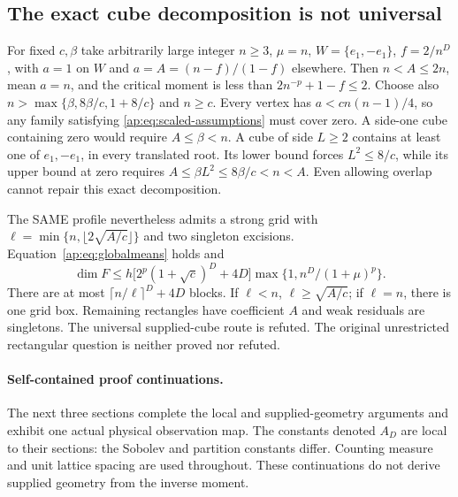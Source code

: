 \documentclass[11pt]{article}
\begin{document}
\subsection{The exact cube decomposition is not universal}
For fixed $c,\beta$ take arbitrarily large integer $n\geq3$, $\mu=n$,
$W=\{e_1,-e_1\}$, $f=2/n^D$, with $a=1$ on $W$ and
$a=A=(n-f)/(1-f)$ elsewhere. Then $n<A\leq2n$, mean $a=n$, and the
critical moment is less than $2n^{-p}+1-f\leq2$. Choose also
$n>\max\{\beta,8\beta/c,1+8/c\}$ and $n\geq c$.
Every vertex has $a<cn(n-1)/4$, so any family satisfying
\eqref{ap:eq:scaled-assumptions} must cover zero. A side-one cube containing
zero would require $A\leq\beta<n$. A cube of side $L\geq2$ contains at
least one of $e_1,-e_1$, in every translated root. Its lower bound forces
$L^2\leq8/c$, while its upper bound at zero requires
$A\leq\beta L^2\leq8\beta/c<n<A$. Even allowing overlap cannot repair
this exact decomposition.

The SAME profile nevertheless admits a strong grid with
$\ell=\min\{n,\lfloor2\sqrt{A/c}\rfloor\}$ and two singleton excisions.
Equation~\eqref{ap:eq:globalmeans} holds and
\[
 \dim F\leq h\bigl[2^p(1+\sqrt c)^D+4D\bigr]
                  \max\{1,n^D/(1+\mu)^p\}.
\]
There are at most $\lceil n/\ell\rceil^D+4D$ blocks. If $\ell<n$,
$\ell\geq\sqrt{A/c}$; if $\ell=n$, there is one grid box. Remaining
rectangles have coefficient $A$ and weak residuals are singletons. The
universal supplied-cube route is refuted. The original unrestricted
rectangular question is neither proved nor refuted.


\paragraph{Self-contained proof continuations.}
The next three sections complete the local and supplied-geometry arguments
and exhibit one actual physical observation map. The constants denoted $A_D$
are local to their sections: the Sobolev and partition constants differ.
Counting measure and unit lattice spacing are used throughout. These
continuations do not derive supplied geometry from the inverse moment.



\end{document}
